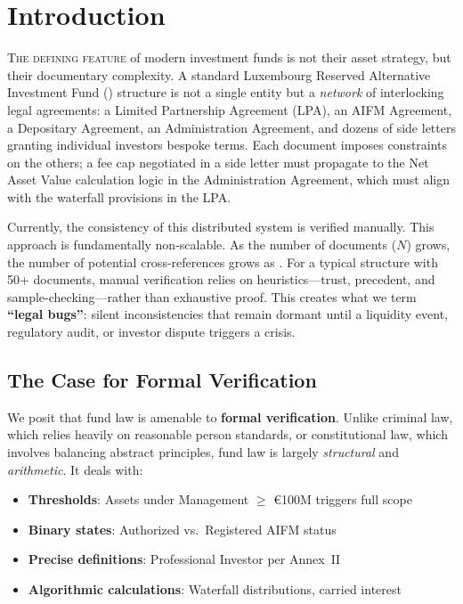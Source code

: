 
\section{Introduction}
\label{sec:introduction}

\lettrine[lines=2, lhang=0.15, loversize=0.1]{T}{he defining feature} of modern investment funds is not their asset strategy, but their documentary complexity. A standard Luxembourg Reserved Alternative Investment Fund (\raif{}) structure is not a single entity but a \textit{network} of interlocking legal agreements: a Limited Partnership Agreement (LPA), an AIFM Agreement, a Depositary Agreement, an Administration Agreement, and dozens of side letters granting individual investors bespoke terms. Each document imposes constraints on the others; a fee cap negotiated in a side letter must propagate to the Net Asset Value calculation logic in the Administration Agreement, which must align with the waterfall provisions in the LPA.

Currently, the consistency of this distributed system is verified manually. This approach is fundamentally non-scalable. As the number of documents ($N$) grows, the number of potential cross-references grows as . For a typical structure with 50+ documents, manual verification relies on heuristics---trust, precedent, and sample-checking---rather than exhaustive proof. This creates what we term \textbf{``legal bugs''}: silent inconsistencies that remain dormant until a liquidity event, regulatory audit, or investor dispute triggers a crisis.

\subsection{The Case for Formal Verification}

We posit that fund law is amenable to \textbf{formal verification}. Unlike criminal law, which relies heavily on reasonable person standards, or constitutional law, which involves balancing abstract principles, fund law is largely \textit{structural} and \textit{arithmetic}. It deals with:

\begin{itemize}[nosep,leftmargin=1.5em]
  \item \textbf{Thresholds}: Assets under Management $\geq$ €100M triggers full \aifmd{} scope
  \item \textbf{Binary states}: Authorized vs.\ Registered AIFM status
  \item \textbf{Precise definitions}: Professional Investor per \mifid{} Annex~II
  \item \textbf{Algorithmic calculations}: Waterfall distributions, carried interest
\end{itemize}

